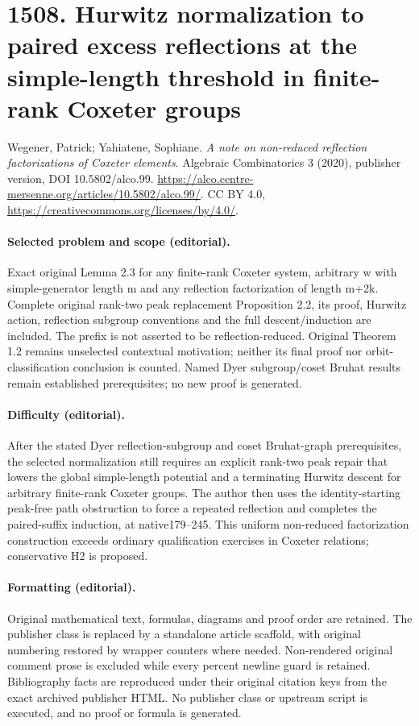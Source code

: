 \documentclass[10pt]{article}
\theoremstyle{definition}
\begin{document}
\section*{1508. Hurwitz normalization to paired excess reflections at the simple-length threshold in finite-rank Coxeter groups}
Wegener, Patrick; Yahiatene, Sophiane. \emph{A note on non-reduced reflection factorizations of Coxeter elements}. Algebraic Combinatorics 3 (2020), publisher version, DOI 10.5802/alco.99. \url{https://alco.centre-mersenne.org/articles/10.5802/alco.99/}. CC BY 4.0, \url{https://creativecommons.org/licenses/by/4.0/}.
\paragraph{Selected problem and scope (editorial).} Exact original Lemma 2.3 for any finite-rank Coxeter system, arbitrary w with simple-generator length m and any reflection factorization of length m+2k. Complete original rank-two peak replacement Proposition 2.2, its proof, Hurwitz action, reflection subgroup conventions and the full descent/induction are included. The prefix is not asserted to be reflection-reduced. Original Theorem 1.2 remains unselected contextual motivation; neither its final proof nor orbit-classification conclusion is counted. Named Dyer subgroup/coset Bruhat results remain established prerequisites; no new proof is generated.
\paragraph{Difficulty (editorial).} After the stated Dyer reflection-subgroup and coset Bruhat-graph prerequisites, the selected normalization still requires an explicit rank-two peak repair that lowers the global simple-length potential and a terminating Hurwitz descent for arbitrary finite-rank Coxeter groups. The author then uses the identity-starting peak-free path obstruction to force a repeated reflection and completes the paired-suffix induction, at native179–245. This uniform non-reduced factorization construction exceeds ordinary qualification exercises in Coxeter relations; conservative H2 is proposed.
\paragraph{Formatting (editorial).} Original mathematical text, formulas, diagrams and proof order are retained. The publisher class is replaced by a standalone article scaffold, with original numbering restored by wrapper counters where needed. Non-rendered original comment prose is excluded while every percent newline guard is retained. Bibliography facts are reproduced under their original citation keys from the exact archived publisher HTML. No publisher class or upstream script is executed, and no proof or formula is generated.
\clearpage
\end{document}
